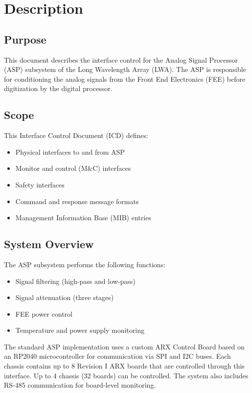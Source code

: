 
\chapter{Description}
\label{sec:description}

\section{Purpose}

This document describes the interface control for the Analog Signal Processor (ASP) subsystem of the Long Wavelength Array (LWA). The ASP is responsible for conditioning the analog signals from the Front End Electronics (FEE) before digitization by the digital processor.

\section{Scope}

This Interface Control Document (ICD) defines:
\begin{itemize}
    \item Physical interfaces to and from ASP
    \item Monitor and control (M\&C) interfaces
    \item Safety interfaces
    \item Command and response message formats
    \item Management Information Base (MIB) entries
\end{itemize}

\section{System Overview}

The ASP subsystem performs the following functions:
\begin{itemize}
    \item Signal filtering (high-pass and low-pass)
    \item Signal attenuation (three stages)
    \item FEE power control
    \item Temperature and power supply monitoring
\end{itemize}

The standard ASP implementation uses a custom ARX Control Board based on an RP2040 microcontroller for communication via SPI and I2C buses. Each chassis contains up to 8 Revision I ARX boards that are controlled through this interface. Up to 4 chassis (32 boards) can be controlled. The system also includes RS-485 communication for board-level monitoring.

